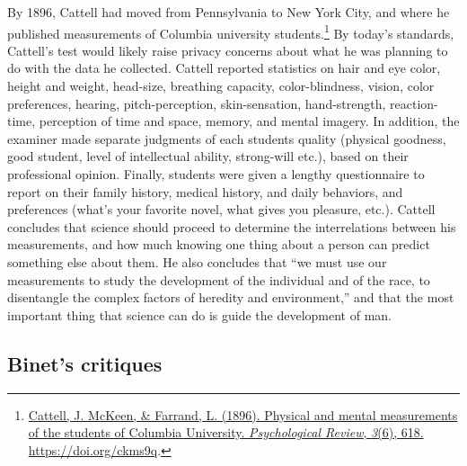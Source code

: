 \documentclass[
  oneside,
  12pt]{crumpbook}
\begin{document}
By 1896, Cattell had moved from Pennsylvania to New York City, and where he published measurements of Columbia university students.\footnote{\protect\hyperlink{ref-cattellPhysicalMentalMeasurements1896}{Cattell, J. McKeen, \& Farrand, L. (1896). Physical and mental measurements of the students of {Columbia University}. \emph{Psychological Review}, \emph{3}(6), 618. \url{https://doi.org/ckms9q}}.} By today's standards, Cattell's test would likely raise privacy concerns about what he was planning to do with the data he collected. Cattell reported statistics on hair and eye color, height and weight, head-size, breathing capacity, color-blindness, vision, color preferences, hearing, pitch-perception, skin-sensation, hand-strength, reaction-time, perception of time and space, memory, and mental imagery. In addition, the examiner made separate judgments of each students quality (physical goodness, good student, level of intellectual ability, strong-will etc.), based on their professional opinion. Finally, students were given a lengthy questionnaire to report on their family history, medical history, and daily behaviors, and preferences (what's your favorite novel, what gives you pleasure, etc.). Cattell concludes that science should proceed to determine the interrelations between his measurements, and how much knowing one thing about a person can predict something else about them. He also concludes that ``we must use our measurements to study the development of the individual and of the race, to disentangle the complex factors of heredity and environment,'' and that the most important thing that science can do is guide the development of man.

\hypertarget{binets-critiques}{%
\subsection{Binet's critiques}\label{binets-critiques}}
\end{document}
